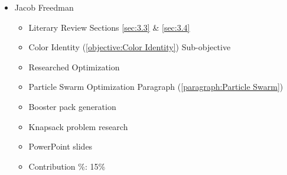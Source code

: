 \documentclass[12pt, letterpaper]{article}
\begin{document}
\begin{itemize}
\begin{itemize}
\end{itemize}

\item Jacob Freedman

\begin{itemize}

    \item Literary Review Sections \ref{sec:3.3} \& \ref{sec:3.4}
    \item Color Identity (\ref{objective:Color Identity}) Sub-objective
    \item Researched Optimization
    \item Particle Swarm Optimization Paragraph (\ref{paragraph:Particle Swarm})
	\item Booster pack generation
	\item Knapsack problem research
	\item PowerPoint slides
    \item Contribution \%: 15\%

\end{itemize}

\end{itemize}
\end{document}
